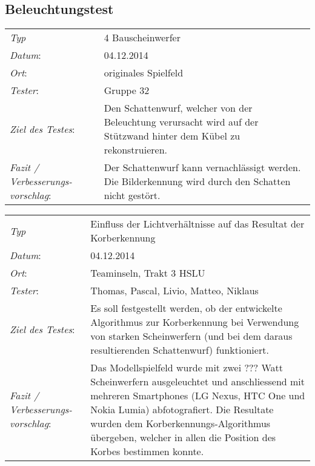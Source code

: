 \subsection{Beleuchtungstest}
\begin{tabular}{p{3.6cm}p{9.4cm}}
\rule{0pt}{11pt}\textit{Typ}              & 4 Bauscheinwerfer \\ 
\rule{0pt}{11pt}\textit{Datum}:           & 04.12.2014   \\
\rule{0pt}{11pt}\textit{Ort}:             & originales Spielfeld \\
\rule{0pt}{11pt}\textit{Tester}:          & Gruppe 32 \\
\rule{0pt}{11pt}\textit{Ziel des Testes}: & Den Schattenwurf, welcher von der Beleuchtung verursacht wird auf der Stützwand hinter dem Kübel zu rekonstruieren. \\
\rule{0pt}{11pt}\textit{Fazit / Verbesserungs-\newline vorschlag}: & 
Der Schattenwurf kann vernachlässigt werden. Die Bilderkennung wird durch den Schatten nicht gestört. 
\end{tabular}

\label{chap:LichtTest}\begin{tabular}{p{3.6cm}p{9.4cm}}
	\rule{0pt}{11pt}\textit{Typ}              & Einfluss der Lichtverhältnisse auf das Resultat der Korberkennung  \\ 
	\rule{0pt}{11pt}\textit{Datum}:           & 04.12.2014   \\
	\rule{0pt}{11pt}\textit{Ort}:             & Teaminseln, Trakt 3 HSLU \\
	\rule{0pt}{11pt}\textit{Tester}:          & Thomas, Pascal, Livio, Matteo, Niklaus\\
	\rule{0pt}{11pt}\textit{Ziel des Testes}: & Es soll festgestellt werden, ob der entwickelte Algorithmus zur Korberkennung bei Verwendung von starken Scheinwerfern (und bei dem daraus resultierenden Schattenwurf) funktioniert.  \\
	\rule{0pt}{11pt}\textit{Fazit / Verbesserungs-\newline vorschlag}: & Das Modellspielfeld wurde mit zwei ??? Watt Scheinwerfern ausgeleuchtet und anschliessend mit mehreren Smartphones (LG Nexus, HTC One und Nokia Lumia) abfotografiert. Die Resultate wurden dem Korberkennungs-Algorithmus übergeben, welcher in allen die Position des Korbes bestimmen konnte.  \\
\end{tabular}